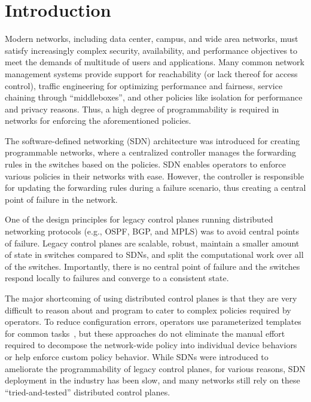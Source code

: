 \section{Introduction}
Modern networks, including data center, campus, 
and wide area networks, 
must satisfy increasingly complex security, 
availability, and performance objectives to 
meet the demands of multitude of users and applications. 
Many common network management systems provide support
for reachability (or lack thereof for access control),
traffic engineering for optimizing performance
and fairness, service chaining through ``middleboxes'', and
other policies like isolation for performance and privacy reasons.
Thus, a high degree of programmability is required in networks
for enforcing the aforementioned policies.

The software-defined networking (SDN) architecture was introduced
for creating programmable networks, where a centralized controller
manages the forwarding rules in the switches based on the policies.
SDN enables operators to enforce various policies in their networks 
with ease. 
However, the controller is responsible for updating the forwarding
rules during a failure scenario, thus creating a central point of 
failure in the network. 

One of the design principles
for legacy control planes running distributed networking protocols 
(e.g., OSPF, BGP, and MPLS) was to avoid central points of failure.
Legacy control planes are scalable, robust, maintain a smaller amount 
of state in switches compared to SDNs, 
and split the computational work over all of the switches. 
Importantly, there is no central point of failure and the switches
respond locally to failures and converge to a consistent state. 

The major shortcoming of using distributed control planes is that
they are very difficult to reason about and program to cater to 
complex policies required by operators. To reduce configuration 
errors, operators use parameterized templates for common
tasks~\cite{config-template}, but these approaches do not eliminate the manual effort
required to decompose the network-wide policy into individual device
behaviors or help enforce custom policy behavior. While SDNs 
were introduced to ameliorate the programmability of legacy control planes, 
for various reasons, 
SDN deployment in the industry has been slow, and many 
networks still rely on these ``tried-and-tested'' distributed 
control planes. 

% 


